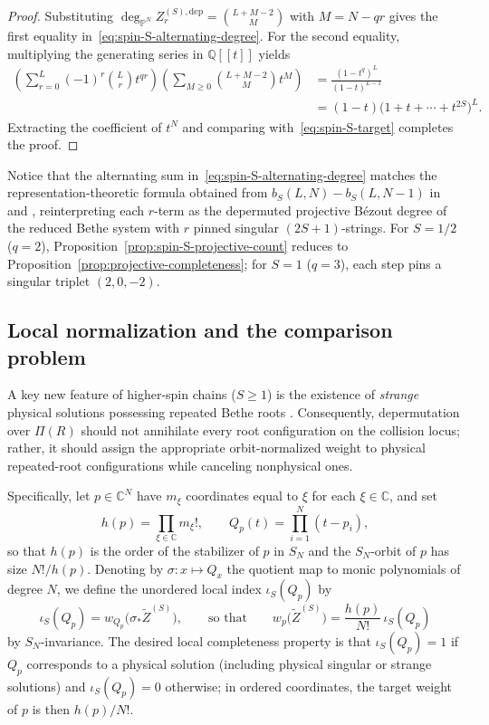 \documentclass[11pt]{article}
\theoremstyle{definition}
\newcommand{\C}{\mathbb{C}}
\begin{document}
\begin{proof}
Substituting $\deg_{\mathbb{P}^N}Z_r^{(S),\mathrm{dep}}=\binom{L+M-2}{M}$ with $M=N-qr$ gives the first equality in~\eqref{eq:spin-S-alternating-degree}. For the second equality, multiplying the generating series in $\mathbb{Q}[[t]]$ yields
\[
 \begin{aligned}
 \left(\sum_{r=0}^L(-1)^r\binom{L}{r} t^{qr}\right)
 \left(\sum_{M\ge 0}\binom{L+M-2}{M}t^M\right)
 &=\frac{(1-t^q)^L}{(1-t)^{L-1}}\\
 &=(1-t)\bigl(1+t+\cdots+t^{2S}\bigr)^L.
 \end{aligned}
\]
Extracting the coefficient of $t^N$ and comparing with~\eqref{eq:spin-S-target} completes the proof.
\end{proof}

Notice that the alternating sum in~\eqref{eq:spin-S-alternating-degree} matches the representation-theoretic formula obtained from $b_S(L,N)-b_S(L,N-1)$ in \cite[Section~2]{HNS2014} and \cite[Section~2.5, eqs.~(2.31)--(2.32)]{HJJ2024}, reinterpreting each $r$-term as the depermuted projective B\'ezout degree of the reduced Bethe system with $r$ pinned singular $(2S+1)$-strings. For $S=1/2$ ($q=2$), Proposition~\ref{prop:spin-S-projective-count} reduces to Proposition~\ref{prop:projective-completeness}; for $S=1$ ($q=3$), each step pins a singular triplet $(2,0,-2)$.

\subsection{Local normalization and the comparison problem}
\label{app:spin-S-local-normalization}

A key new feature of higher-spin chains ($S\ge 1$) is the existence of \emph{strange} physical solutions possessing repeated Bethe roots \cite{HNS2014,HJJ2024}. Consequently, depermutation over $\Pi(R)$ should not annihilate every root configuration on the collision locus; rather, it should assign the appropriate orbit-normalized weight to physical repeated-root configurations while canceling nonphysical ones.

Specifically, let $p\in\C^N$ have $m_\xi$ coordinates equal to $\xi$ for each $\xi\in\C$, and set
\[
 h(p)=\prod_{\xi\in\C} m_\xi!,\qquad
 Q_p(t)=\prod_{i=1}^N(t-p_i),
\]
so that $h(p)$ is the order of the stabilizer of $p$ in $S_N$ and the $S_N$-orbit of $p$ has size $N!/h(p)$. Denoting by
$\sigma:x\mapsto Q_x$ the quotient map to monic polynomials of degree $N$, we define
the unordered local index $\iota_S(Q_p)$ by
\begin{equation}\label{eq:spin-S-unordered-index}
 \iota_S(Q_p)=w_{Q_p}\!\bigl(\sigma_*\tilde{Z}^{(S)}\bigr),\qquad\text{so that}\qquad
 w_p\bigl(\tilde{Z}^{(S)}\bigr)=\frac{h(p)}{N!}\,\iota_S(Q_p)
\end{equation}
by $S_N$-invariance. The desired local completeness property is that $\iota_S(Q_p)=1$ if $Q_p$ corresponds to a physical solution (including physical singular or strange solutions)
and $\iota_S(Q_p)=0$ otherwise; in ordered coordinates, the target weight of $p$ is then $h(p)/N!$.
\end{document}
